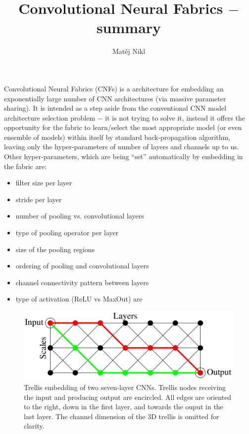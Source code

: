 \documentclass[a4paper,twocolumn]{article}
\title{Convolutional Neural Fabrics $-$ summary}
\author{Matěj Nikl}
\begin{document}
\maketitle
Convolutional Neural Fabrics (CNFs) is a architecture for embedding an exponentially large number of CNN architectures (via massive parameter sharing). It is intended as a step aside from the conventional CNN model architecture selection problem $-$  it is not trying to solve it, instead it offers the opportunity for the fabric to learn/select the most appropriate model (or even ensemble of models) within itself by standard back-propagation algorithm, leaving only the hyper-parameters of number of layers and channels up to us.
Other hyper-parameters, which are being ``set'' automatically by embedding in the fabric are:
\begin{itemize}
    \item filter size per layer
    \item stride per layer
    \item number of pooling vs. convolutional layers
    \item type of pooling operator per layer
    \item size of the pooling regions
    \item ordering of pooling and convolutional layers
    \item channel connectivity pattern between layers
    \item type of activation (ReLU vs MaxOut) are
\end{itemize}


\begin{figure}[!h]
    \includegraphics[width=\columnwidth]{fabrics1.png}
    \caption{Trellis embedding of two seven-layer CNNs. Trellis nodes receiving the input and producing output are encircled. All edges are oriented to the right, down in the first layer, and towards the ouput in the last layer. The channel dimension of the 3D trellis is omitted for clarity.}
\end{figure}
\end{document}
